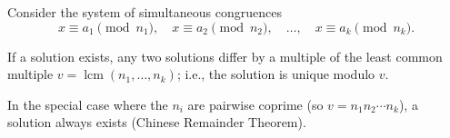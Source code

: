 Consider the system of simultaneous congruences
$$x \equiv a_1 \pmod{n_1},\quad x \equiv a_2 \pmod{n_2},\quad \ldots,\quad x \equiv a_k \pmod{n_k}.$$

If a solution exists, any two solutions differ by a multiple of the least common multiple $v = \operatorname{lcm}(n_1, \ldots, n_k)$; i.e., the solution is unique modulo $v$.

In the special case where the $n_i$ are pairwise coprime (so $v = n_1 n_2 \cdots n_k$), a solution always exists (Chinese Remainder Theorem).
